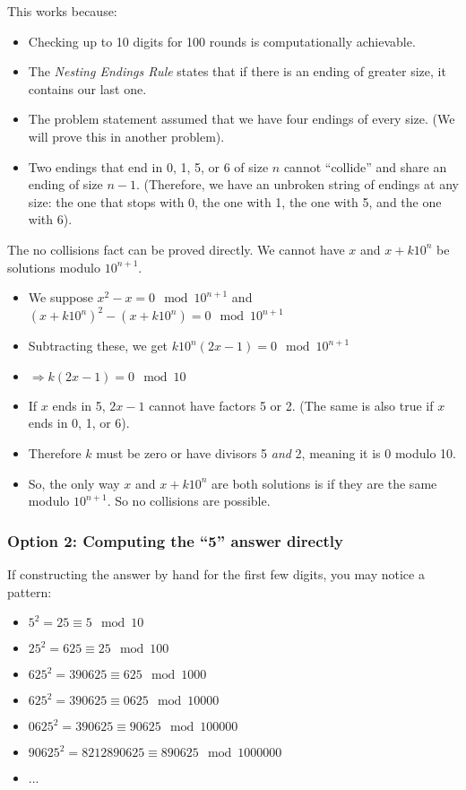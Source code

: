 \documentclass[11pt, oneside]{article} 	%
\begin{document}
This works because:
\begin{itemize}
\item Checking up to 10 digits for 100 rounds is computationally achievable.
\item The \emph{Nesting Endings Rule} states that if there is an ending of greater size, it contains our last one.
\item The problem statement assumed that we have four endings of every size.  (We will prove this in another problem).
\item Two endings that end in 0, 1, 5, or 6 of size $n$ cannot ``collide'' and share an ending of size $n-1$.   (Therefore, we have an unbroken string of endings at any size: the one that stops with 0, the one with 1, the one with 5, and the one with 6).
\end{itemize}

The no collisions fact can be proved directly.  We cannot have $x$ and $x+k10^n$ be solutions modulo $10^{n+1}$.
\begin{itemize}
\item We suppose $x^2 - x = 0 \mod 10^{n+1}$ and $(x+k10^n)^2 - (x + k10^n) = 0 \mod 10^{n+1}$
\item Subtracting these, we get $k10^n(2x - 1) = 0 \mod 10^{n+1}$
\item $\Rightarrow k(2x-1) = 0 \mod 10$
\item If $x$ ends in 5, $2x - 1$ cannot have factors 5 or 2.  (The same is also true if $x$ ends in 0, 1, or 6).
\item Therefore $k$ must be zero or have divisors 5 \emph{and} 2, meaning it is $0$ modulo 10.
\item So, the only way $x$ and $x+k10^n$ are both solutions is if they are the same modulo $10^{n+1}$.  So no collisions are possible.
\end{itemize}



\subsubsection{Option 2: Computing the ``5'' answer directly}

If constructing the answer by hand for the first few digits, you may notice a pattern:
\begin{itemize}
\item $5^2 = 25 \equiv 5 \mod 10$
\item $25^2 = 625 \equiv 25 \mod 100$
\item $625^2 = 390625 \equiv 625 \mod 1000$
\item $625^2  = 390625 \equiv 0625 \mod 10000$
\item $0625^2  = 390625 \equiv 90625 \mod 100000$
\item $90625^2 = 8212890625 \equiv 890625 \mod 1000000$
\item ...
\end{itemize}
\end{document}
